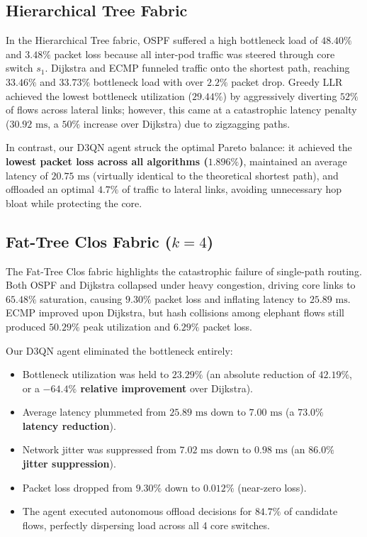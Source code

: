 \subsection{Hierarchical Tree Fabric}
In the Hierarchical Tree fabric, OSPF suffered a high bottleneck load of $48.40\%$ and $3.48\%$ packet loss because all inter-pod traffic was steered through core switch $s_1$. Dijkstra and ECMP funneled traffic onto the shortest path, reaching $33.46\%$ and $33.73\%$ bottleneck load with over $2.2\%$ packet drop. Greedy LLR achieved the lowest bottleneck utilization ($29.44\%$) by aggressively diverting $52\%$ of flows across lateral links; however, this came at a catastrophic latency penalty ($30.92\text{ ms}$, a $50\%$ increase over Dijkstra) due to zigzagging paths.

In contrast, our D3QN agent struck the optimal Pareto balance: it achieved the \textbf{lowest packet loss across all algorithms ($1.896\%$)}, maintained an average latency of \textbf{$20.75\text{ ms}$} (virtually identical to the theoretical shortest path), and offloaded an optimal $4.7\%$ of traffic to lateral links, avoiding unnecessary hop bloat while protecting the core.

\subsection{Fat-Tree Clos Fabric ($k=4$)}
The Fat-Tree Clos fabric highlights the catastrophic failure of single-path routing. Both OSPF and Dijkstra collapsed under heavy congestion, driving core links to $65.48\%$ saturation, causing $9.30\%$ packet loss and inflating latency to $25.89\text{ ms}$. ECMP improved upon Dijkstra, but hash collisions among elephant flows still produced $50.29\%$ peak utilization and $6.29\%$ packet loss.

Our D3QN agent eliminated the bottleneck entirely:
\begin{itemize}
    \item Bottleneck utilization was held to \textbf{$23.29\%$} (an absolute reduction of \textbf{$42.19\%$}, or a \textbf{$-64.4\%$ relative improvement} over Dijkstra).
    \item Average latency plummeted from $25.89\text{ ms}$ down to \textbf{$7.00\text{ ms}$} (a \textbf{$73.0\%$ latency reduction}).
    \item Network jitter was suppressed from $7.02\text{ ms}$ down to \textbf{$0.98\text{ ms}$} (an \textbf{$86.0\%$ jitter suppression}).
    \item Packet loss dropped from $9.30\%$ down to \textbf{$0.012\%$} (near-zero loss).
    \item The agent executed autonomous offload decisions for \textbf{$84.7\%$} of candidate flows, perfectly dispersing load across all 4 core switches.
\end{itemize}

